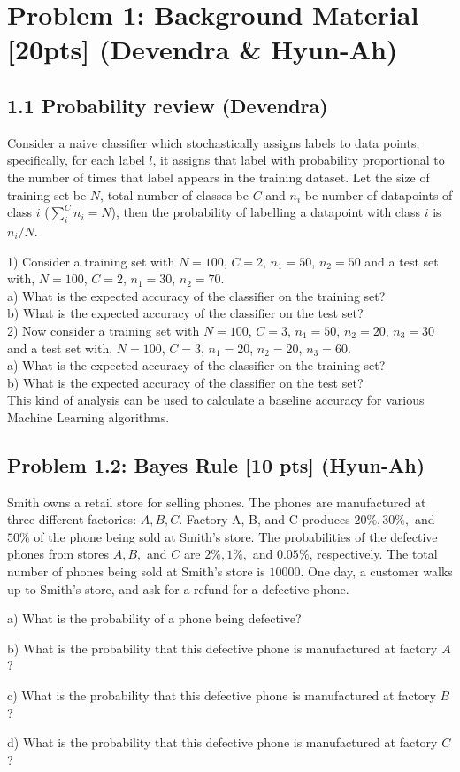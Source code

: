 
\section*{Problem 1: Background Material [20pts] (Devendra \& Hyun-Ah)}

\subsection*{1.1 Probability review (Devendra)}

Consider a naive classifier which stochastically assigns labels to data points; specifically, for each label $l$, it assigns that label with probability proportional to the number of times that label appears in the training dataset. Let the size of training set be $N$, total number of classes be $C$ and $n_i$ be number of datapoints of class $i$ ($\sum_i^C{n_i} = N$), then the probability of labelling a datapoint with class $i$ is $n_i/N$.

1) Consider a training set with $N=100$, $C=2$, $n_1 = 50$, $n_2=50$ and a test set with, $N=100$, $C= 2$, $n_1 = 30$, $n_2 = 70$.\\
a) What is the expected accuracy of the classifier on the training set?\\
b) What is the expected accuracy of the classifier on the test set?\\

2) Now consider a training set with $N=100$, $C=3$, $n_1 = 50$, $n_2=20$, $n_3=30$ and a test set with, $N=100$, $C= 3$, $n_1 = 20$, $n_2 = 20$, $n_3 = 60$.\\
a) What is the expected accuracy of the classifier on the training set?\\
b) What is the expected accuracy of the classifier on the test set?\\

This kind of analysis can be used to calculate a baseline accuracy for various Machine Learning algorithms. 

\subsection* {Problem 1.2: Bayes Rule [10 pts] (Hyun-Ah) }

Smith owns a retail store for selling phones. The phones are manufactured at three different factories: $A, B, C$. Factory A, B, and C produces $20\%, 30\%,$ and $50\%$ of the phone being sold at Smith's store. The probabilities of the defective phones from stores $A, B,$ and $C$ are $2\%, 1\%,$ and $0.05\%$, respectively. The total number of phones being sold at Smith's store is $10000$. 
One day, a customer walks up to Smith's store, and ask for a refund for a defective phone.

a) What is the probability of a phone being defective?

b) What is the probability that this defective phone is manufactured at factory $A$?

c) What is the probability that this defective phone is manufactured at factory $B$?

d) What is the probability that this defective phone is manufactured at factory $C$?

\newpage